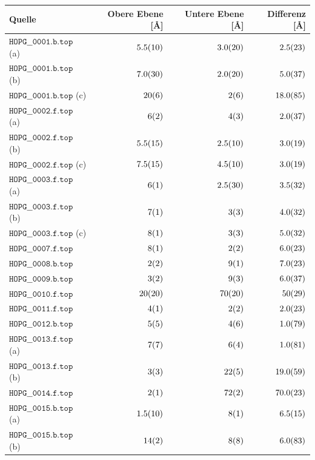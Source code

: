 \documentclass[a4paper,german,12pt,smallheadings]{scrartcl}
\begin{document}
\vspace{5mm}
 \begin{tabular}{l|r|r|r}
  Quelle & Obere Ebene [\AA] & Untere Ebene [\AA] & Differenz [\AA] \\
   \hline
   $\texttt{HOPG\_\_0001.b.top}$ (a) & $\num{5.5+-1.0}$ & $\num{3.0+-2.0}$ & $\num{2.5+-2.3}$ \\
   $\texttt{HOPG\_\_0001.b.top}$ (b) & $\num{7.0+-3.0}$ & $\num{2.0+-2.0}$ & $\num{5+-3.7}$ \\
   $\texttt{HOPG\_\_0001.b.top}$ (c) & $\num{20+-6}$    & $\num{2+-6}$     & $\num{18+-8.5}$ \\
   $\texttt{HOPG\_\_0002.f.top}$ (a) & $\num{6+-2}$     & $\num{4+-3}$     & $\num{2+-3.7}$ \\
   $\texttt{HOPG\_\_0002.f.top}$ (b) & $\num{5.5+-1.5}$ & $\num{2.5+-1}$   & $\num{3+-1.9}$ \\
   $\texttt{HOPG\_\_0002.f.top}$ (c) & $\num{7.5+-1.5}$ & $\num{4.5+-1}$   & $\num{3+-1.9}$ \\
   $\texttt{HOPG\_\_0003.f.top}$ (a) & $\num{6+-1}$     & $\num{2.5+-3}$   & $\num{3.5+-3.2}$ \\
   $\texttt{HOPG\_\_0003.f.top}$ (b) & $\num{7+-1}$     & $\num{3+-3}$     & $\num{4+-3.2}$ \\
   $\texttt{HOPG\_\_0003.f.top}$ (c) & $\num{8+-1}$     & $\num{3+-3}$     & $\num{5+-3.2}$ \\
   $\texttt{HOPG\_\_0007.f.top}$     & $\num{8+-1}$     & $\num{2+-2}$     & $\num{6+-2.3}$ \\
   $\texttt{HOPG\_\_0008.b.top}$     & $\num{2+-2}$     & $\num{9+-1}$     & $\num{7+-2.3}$ \\
   $\texttt{HOPG\_\_0009.b.top}$     & $\num{3+-2}$     & $\num{9+-3}$     & $\num{6+-3.7}$ \\
   $\texttt{HOPG\_\_0010.f.top}$     & $\num{20+-20}$   & $\num{70+-20}$   & $\num{50+-29}$ \\
   $\texttt{HOPG\_\_0011.f.top}$     & $\num{4+-1}$     & $\num{2+-2}$     & $\num{2+-2.3}$ \\
   $\texttt{HOPG\_\_0012.b.top}$     & $\num{5+-5}$     & $\num{4+-6}$     & $\num{1+-7.9}$ \\
   $\texttt{HOPG\_\_0013.f.top}$ (a) & $\num{7+-7}$     & $\num{6+-4}$     & $\num{1+-8.1}$ \\
   $\texttt{HOPG\_\_0013.f.top}$ (b) & $\num{3+-3}$     & $\num{22+-5}$    & $\num{19+-5.9}$ \\
   $\texttt{HOPG\_\_0014.f.top}$     & $\num{2+-1}$     & $\num{72+-2}$    & $\num{70+-2.3}$ \\
   $\texttt{HOPG\_\_0015.b.top}$ (a) & $\num{1.5+-1}$   & $\num{8+-1}$     & $\num{6.5+-1.5}$ \\
   $\texttt{HOPG\_\_0015.b.top}$ (b) & $\num{14+-2}$    & $\num{8+-8}$     & $\num{6+-8.3}$ \\
 \end{tabular}
\vspace{5mm}
\end{document}
